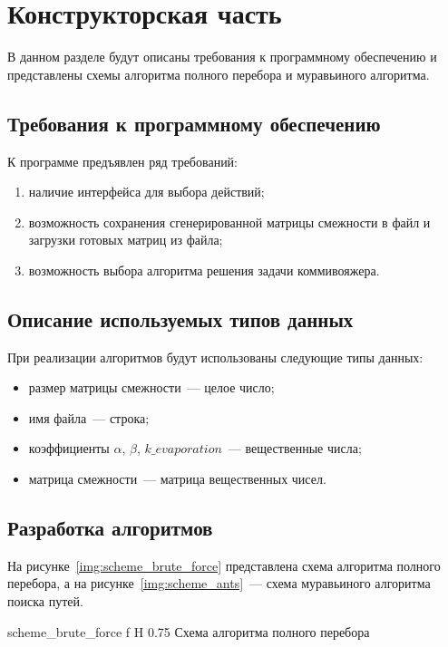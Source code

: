 \chapter{Конструкторская часть}

В данном разделе будут описаны требования к программному обеспечению и представлены схемы алгоритма полного перебора и муравьиного алгоритма.

\section{Требования к программному обеспечению}

К программе предъявлен ряд требований:
\begin{enumerate}
	\item наличие интерфейса для выбора действий;
	\item возможность сохранения сгенерированной матрицы смежности в файл и загрузки готовых матриц из файла;
	\item возможность выбора алгоритма решения задачи коммивояжера. 
\end{enumerate}

\section{Описание используемых типов данных}

При реализации алгоритмов будут использованы следующие типы данных:
\begin{itemize}
	\item размер матрицы смежности~--- целое число;
	\item имя файла~--- строка;
	\item коэффициенты $\alpha$, $\beta$, $k\_evaporation$~--- вещественные числа;
	\item матрица смежности~--- матрица вещественных чисел.
\end{itemize}

\section{Разработка алгоритмов}

На рисунке~\ref{img:scheme_brute_force} представлена схема алгоритма полного перебора, а на рисунке~\ref{img:scheme_ants}~--- схема муравьиного алгоритма поиска путей.

	{scheme_brute_force}
	{f}
	{H}
	{0.75\textwidth}
	{Схема алгоритма полного перебора}
	
